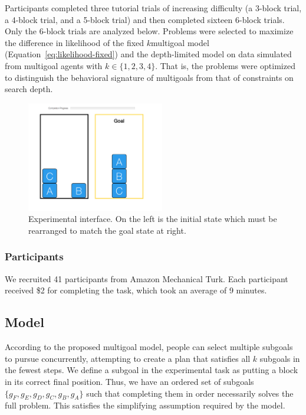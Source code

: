\documentclass[10pt,letterpaper]{article}
\newcommand{\red}[1]{\textcolor{red}{#1}}
\begin{document}
Participants completed three tutorial trials of increasing difficulty (a 3-block trial, a 4-block trial, and a 5-block trial) and then completed sixteen 6-block trials. Only the 6-block trials are analyzed below. Problems were selected to maximize the difference in likelihood of the fixed $k$multigoal model (Equation~\ref{eq:likelihood-fixed}) and the depth-limited model on data simulated from multigoal agents with $k \in \{ 1,2,3,4 \}$. That is, the problems were optimized to distinguish the behavioral signature of multigoals from that of constraints on search depth.

\begin{figure}[ht]
    \centering
    \includegraphics[width=6cm]{example-block-world.png}
    \caption{Experimental interface. On the left is the initial state which must be rearranged to match the goal state at right.}
\end{figure}

\subsubsection{Participants}
We recruited 41 participants from Amazon Mechanical Turk. Each participant received \$2 for completing the task, which took an average of 9 minutes.

\subsection{Model}
 
According to the proposed multigoal model, people can select multiple subgoals to pursue concurrently, attempting to create a plan that satisfies all $k$ subgoals in the fewest steps. We define a subgoal in the experimental task as putting a block in its correct final position. Thus, we have an ordered set of subgoals $\{ g_F, g_E, g_D, g_C, g_B, g_A \}$ such that completing them in order necessarily solves the full problem. This satisfies the simplifying assumption required by the model.
\end{document}
